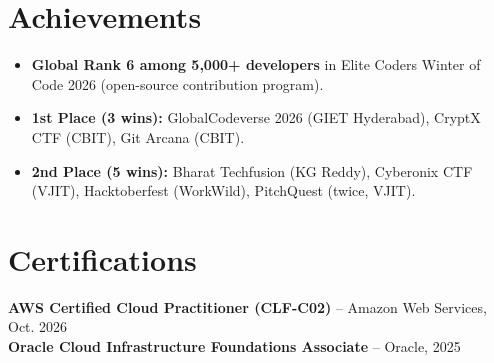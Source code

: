 \documentclass[letterpaper,11pt]{article}
\newcommand{\bulletListStart}{\begin{itemize}[leftmargin=0.21in,label=\textbullet,topsep=3pt,partopsep=0pt,itemsep=2.6pt,parsep=0pt]}
\newcommand{\bulletListEnd}{\end{itemize}}
\newcommand{\rBullet}[1]{\item\small #1}
\begin{document}
\section{Achievements}
\bulletListStart
  \rBullet{\textbf{Global Rank 6 among 5,000+ developers} in Elite Coders Winter of Code 2026 (open-source contribution program).}
  \rBullet{\textbf{1st Place (3 wins):} GlobalCodeverse 2026 (GIET Hyderabad), CryptX CTF (CBIT), Git Arcana (CBIT).}
  \rBullet{\textbf{2nd Place (5 wins):} Bharat Techfusion (KG Reddy), Cyberonix CTF (VJIT), Hacktoberfest (WorkWild), PitchQuest (twice, VJIT).}
\bulletListEnd

\section{Certifications}
{\small
\textbf{AWS Certified Cloud Practitioner (CLF-C02)} -- Amazon Web Services, Oct. 2026\\[1pt]
\textbf{Oracle Cloud Infrastructure Foundations Associate} -- Oracle, 2025
}
\end{document}

